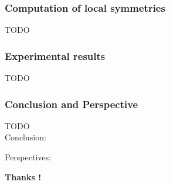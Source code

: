 \documentclass{beamer}
\begin{document}
\begin{frame}
\frametitle{Computation of local symmetries}
TODO\\

\end{frame}

\begin{frame}
\frametitle{Experimental results}
TODO\\

\end{frame}



\begin{frame}
\frametitle{Conclusion and Perspective}
TODO\\
Conclusion:

Perspectives:

\vfill
\textbf{Thanks !}
\end{frame}
\end{document}
